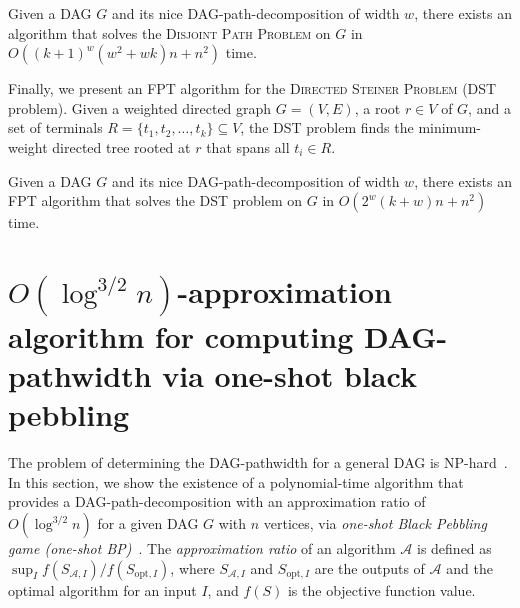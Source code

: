 \documentclass[runningheads]{llncs}
\theoremstyle{plain}
\theoremstyle{definition}
\begin{document}
\begin{theorem}\label{theorem_disjoint_path}
    Given a DAG \(G\) and its nice DAG-path-decomposition of width \(w\), there exists an algorithm that solves the \textsc{Disjoint Path Problem} on \(G\) in \(O((k+1)^w (w^2 + wk) n + n^2)\) time.  
\end{theorem}

Finally, we present an FPT algorithm for the \textsc{Directed Steiner Problem} (DST problem).  
Given a weighted directed graph \(G = (V, E)\), a root \(r \in V\) of $G$, and a set of terminals \(R = \{t_1, t_2, \dots, t_k\} \subseteq V\), the DST problem finds the minimum-weight directed tree rooted at \(r\) that spans all \(t_i \in R\).  

\begin{theorem}\label{theorem_DST}
    Given a DAG \(G\) and its nice DAG-path-decomposition of width \(w\), there exists an FPT algorithm that solves the DST problem on \(G\) in \(O(2^w (k+w) n + n^2)\) time.  
\end{theorem}















\section{$O(\log^{3/2} n)$-approximation algorithm for computing DAG-pathwidth via one-shot black pebbling}\label{chapter4}


The problem of determining the DAG-pathwidth for a general DAG is NP-hard~\cite{art12}.
In this section, we show the existence of a polynomial-time algorithm that provides a DAG-path-decomposition with an approximation ratio of $O(\log ^{3/2} n)$ for a given DAG $G$ with $n$ vertices, via \emph{one-shot Black Pebbling game (one-shot BP)}~\cite{art16}.
The \emph{approximation ratio} of an algorithm $\mathcal{A}$ is defined as $\sup_{I}f(S_{\mathcal{A}, I})/f(S_{\mathrm{opt}, I})$, where $S_{\mathcal{A}, I}$ and $S_{\mathrm{opt}, I}$ are the outputs of $\mathcal{A}$ and the optimal algorithm for an input $I$, and $f(S)$ is the objective function value.
\end{document}
